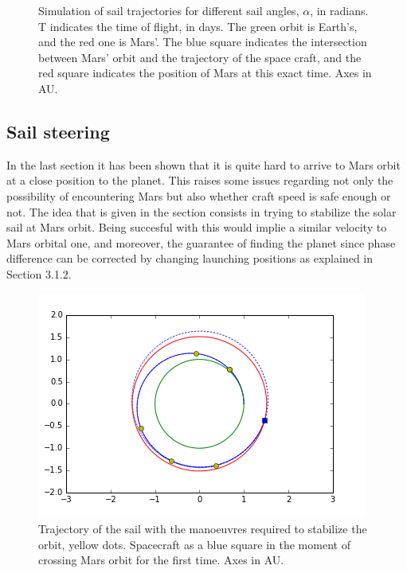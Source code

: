 \documentclass[twocolumn,12pt,a4paper]{article}
\numberwithin{equation}{section}
\begin{document}
\begin{figure}
	\caption{Simulation of sail trajectories for different sail angles, $\alpha$, in radians. T indicates the time of flight, in days. The green orbit is Earth's, and the red one is Mars'. The blue square indicates the intersection between Mars' orbit and the trajectory of the space craft, and the red square indicates the position of Mars at this exact time. Axes in AU.}
	\label{fig:espirals}
\end{figure}
\subsection{Sail steering}
In the last section it has been shown that it is quite hard to arrive to Mars orbit at a close position to the planet. This raises some issues regarding not only the possibility of encountering Mars but also whether craft speed is safe enough or not. The idea that is given in the section consists in trying to stabilize the solar sail at Mars orbit. Being succesful with this would implie a similar velocity to Mars orbital one, and moreover, the guarantee of finding the planet since phase difference can be corrected by changing launching positions as explained in Section 3.1.2. 
\begin{figure}
	\centering
	\label{fig:maniobres}
	\includegraphics[scale=0.55]{Maniobres.png}
	\caption{Trajectory of the sail with the manoeuvres required to stabilize the orbit, yellow dots. Spacecraft as a blue square in the moment of crossing Mars orbit for the first time. Axes in AU.}
\end{figure}
\end{document}
